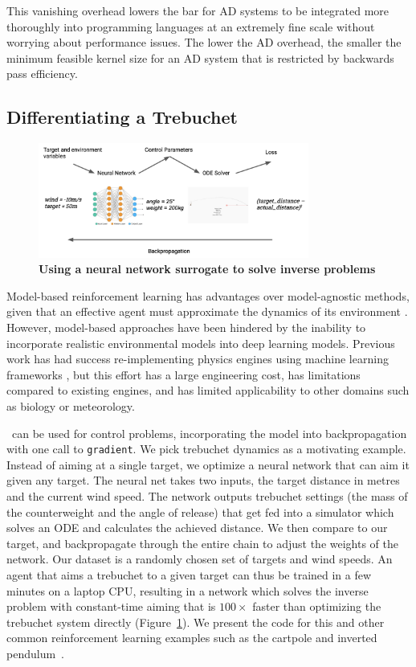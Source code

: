 \documentclass{juliacon}
\newcommand{\Zygote}{\iftoggle{anonymous}{$\partial$P.jl}{Zygote}}
\begin{document}
This vanishing overhead lowers the bar for AD systems to be integrated more thoroughly into programming languages at an extremely fine scale without worrying about performance issues. The lower the AD overhead, the smaller the minimum feasible kernel size for an AD system that is restricted by backwards pass efficiency.

\subsection{Differentiating a Trebuchet}

\begin{figure}[!htb]
  \centering\includegraphics[width=3.5in]{images/trebuchet-flow.png}
  \caption{{\bf Using a neural network surrogate to solve inverse problems}}
  \label{fig:trebuchet}
\end{figure}

Model-based reinforcement learning has advantages over model-agnostic methods, given that an effective agent must approximate the dynamics of its environment \cite{atkeson1997comparison}. However, model-based approaches have been hindered by the inability to incorporate realistic environmental models into deep learning models. Previous work has had success re-implementing physics engines using machine learning frameworks \cite{Degrave_2019,de2018end}, but this effort has a large engineering cost, has limitations compared to existing engines, and has limited applicability to other domains such as biology or meteorology.

 \Zygote\ can be used for  control problems, incorporating the model into backpropagation with one call to \texttt{gradient}. We pick trebuchet dynamics as a motivating example. Instead of aiming at a single target, we optimize a neural network that can aim it given any target. The neural net takes two inputs, the target distance in metres and the current wind speed. The network outputs trebuchet settings (the mass of the counterweight and the angle of release) that get fed into a simulator which solves an ODE and calculates the achieved distance. We then compare to our target, and backpropagate through the entire chain to adjust the weights of the network. Our dataset is a randomly chosen set of targets and wind speeds. An agent that aims a trebuchet to a given target can thus be trained in a few minutes on a laptop CPU, resulting in a network which solves the inverse problem with constant-time aiming that is $100\times$ faster than optimizing the trebuchet system directly (Figure~\ref{fig:trebuchet}). We present the code for this and other common reinforcement learning examples such as the cartpole and inverted pendulum~\cite{rlvsdp}.
\end{document}
